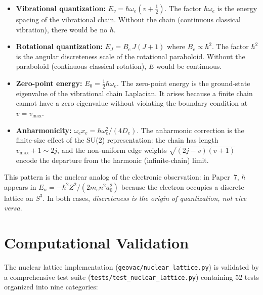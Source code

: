 \documentclass[aps,pra,twocolumn,superscriptaddress,longbibliography]{revtex4-2}
\begin{document}
\begin{itemize}
\item \textbf{Vibrational quantization:}
$E_v = \hbar\omega_e(v + \tfrac{1}{2})$.  The factor $\hbar\omega_e$
is the energy spacing of the vibrational chain.  Without the chain
(continuous classical vibration), there would be no $\hbar$.

\item \textbf{Rotational quantization:}
$E_J = B_e\,J(J+1)$ where $B_e \propto \hbar^2$.  The factor $\hbar^2$
is the angular discreteness scale of the rotational paraboloid.  Without
the paraboloid (continuous classical rotation), $E$ would be continuous.

\item \textbf{Zero-point energy:}
$E_0 = \tfrac{1}{2}\hbar\omega_e$.  The zero-point energy is the
ground-state eigenvalue of the vibrational chain Laplacian.  It arises
because a finite chain cannot have a zero eigenvalue without violating
the boundary condition at $v = v_{\max}$.

\item \textbf{Anharmonicity:}
$\omega_e x_e = \hbar\omega_e^2/(4D_e)$.  The anharmonic correction is
the finite-size effect of the SU(2) representation: the chain has length
$v_{\max} + 1 \sim 2j$, and the non-uniform edge weights
$\sqrt{(2j-v)(v+1)}$ encode the departure from the harmonic
(infinite-chain) limit.
\end{itemize}

This pattern is the nuclear analog of the electronic observation: in
Paper~7, $\hbar$ appears in $E_n = -\hbar^2 Z^2/(2m_e n^2 a_0^2)$
because the electron occupies a discrete lattice on $S^3$.  In both
cases, \emph{discreteness is the origin of quantization, not vice versa}.


\section{Computational Validation}
\label{sec:validation}

The nuclear lattice implementation (\texttt{geovac/nuclear\_lattice.py})
is validated by a comprehensive test suite
(\texttt{tests/test\_nuclear\_lattice.py}) containing 52 tests organized
into nine categories:
\end{document}
